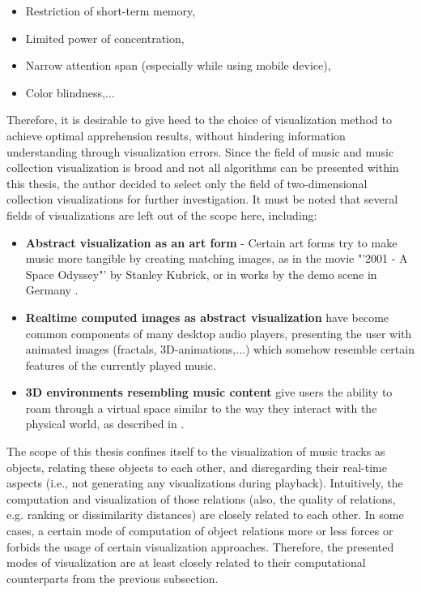\begin{itemize}
	\item Restriction of short-term memory,
	\item Limited power of concentration,
	\item Narrow attention span (especially while using mobile device),
	\item Color blindness,...
\end{itemize}

Therefore, it is desirable to give heed to the choice of visualization method to achieve optimal apprehension results, without hindering information understanding through visualization errors.
Since the field of music and music collection visualization is broad and not all algorithms can be presented within this thesis, the author decided to select only the field of two-dimensional collection visualizations for further investigation. It must be noted that several fields of visualizations are left out of the scope here, including:

\begin{itemize}
	\item \textbf{Abstract visualization as an art form} - Certain art forms try to make music more tangible by creating matching images, as in the movie "'2001 - A Space Odyssey"' by Stanley Kubrick, or in works by the demo scene in Germany \cite{Scheib:2002}.
	\item \textbf{Realtime computed images as abstract visualization} have become common components of many desktop audio players, presenting the user with animated images (fractals, 3D-animations,...) which somehow resemble certain features of the currently played music.
	\item \textbf{3D environments resembling music content} give users the ability to roam through a virtual space similar to the way they interact with the physical world, as described in \cite{Dittenbach:2007}.
\end{itemize}

The scope of this thesis confines itself to the visualization of music tracks as objects, relating these objects to each other, and disregarding their real-time aspects (i.e., not generating any visualizations during playback).
Intuitively, the computation and visualization of those relations (also, the quality of relations, e.g. ranking or dissimilarity distances) are closely related to each other. In some cases, a certain mode of computation of object relations more or less forces or forbids the usage of certain visualization approaches. Therefore, the presented modes of visualization are at least closely related to their computational counterparts from the previous subsection.

